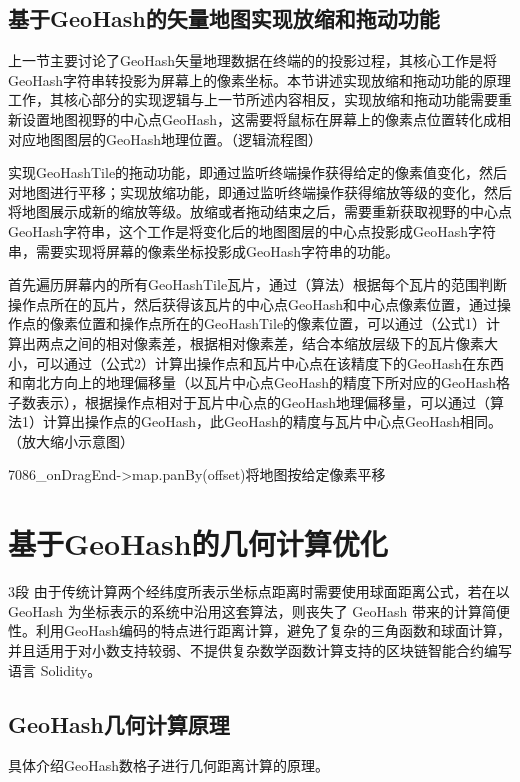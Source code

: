 
\subsection{基于GeoHash的矢量地图实现放缩和拖动功能}

上一节主要讨论了GeoHash矢量地理数据在终端的的投影过程，其核心工作是将GeoHash字符串转投影为屏幕上的像素坐标。本节讲述实现放缩和拖动功能的原理工作，其核心部分的实现逻辑与上一节所述内容相反，实现放缩和拖动功能需要重新设置地图视野的中心点GeoHash，这需要将鼠标在屏幕上的像素点位置转化成相对应地图图层的GeoHash地理位置。（逻辑流程图）

实现GeoHashTile的拖动功能，即通过监听终端操作获得给定的像素值变化，然后对地图进行平移；实现放缩功能，即通过监听终端操作获得缩放等级的变化，然后将地图展示成新的缩放等级。放缩或者拖动结束之后，需要重新获取视野的中心点GeoHash字符串，这个工作是将变化后的地图图层的中心点投影成GeoHash字符串，需要实现将屏幕的像素坐标投影成GeoHash字符串的功能。

首先遍历屏幕内的所有GeoHashTile瓦片，通过（算法）根据每个瓦片的范围判断操作点所在的瓦片，然后获得该瓦片的中心点GeoHash和中心点像素位置，通过操作点的像素位置和操作点所在的GeoHashTile的像素位置，可以通过（公式1）计算出两点之间的相对像素差，根据相对像素差，结合本缩放层级下的瓦片像素大小，可以通过（公式2）计算出操作点和瓦片中心点在该精度下的GeoHash在东西和南北方向上的地理偏移量（以瓦片中心点GeoHash的精度下所对应的GeoHash格子数表示），根据操作点相对于瓦片中心点的GeoHash地理偏移量，可以通过（算法1）计算出操作点的GeoHash，此GeoHash的精度与瓦片中心点GeoHash相同。（放大缩小示意图）

7086_onDragEnd->map.panBy(offset)将地图按给定像素平移

\section{基于GeoHash的几何计算优化}3段
由于传统计算两个经纬度所表示坐标点距离时需要使用球面距离公式，若在以 GeoHash 为坐标表示的系统中沿用这套算法，则丧失了 GeoHash 带来的计算简便性。利用GeoHash编码的特点进行距离计算，避免了复杂的三角函数和球面计算，并且适用于对小数支持较弱、不提供复杂数学函数计算支持的区块链智能合约编写语言 Solidity。

\subsection{GeoHash几何计算原理}
具体介绍GeoHash数格子进行几何距离计算的原理。

